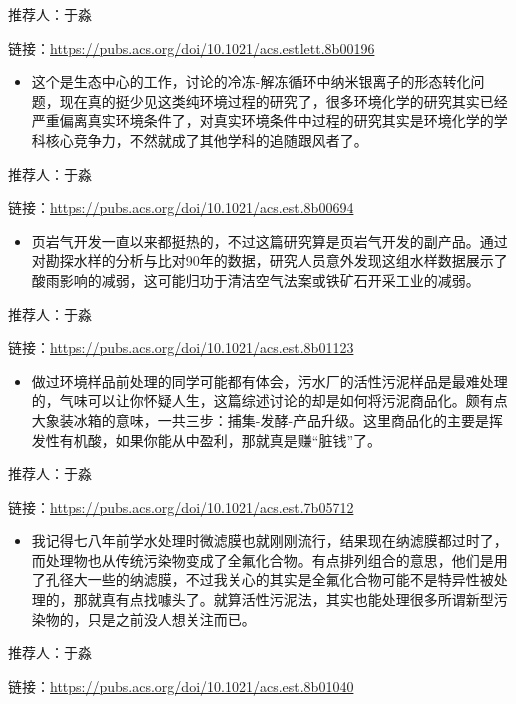 \documentclass[]{book}
\providecommand{\tightlist}{%
  \setlength{\itemsep}{0pt}\setlength{\parskip}{0pt}}
\begin{document}
推荐人：于淼

链接：\url{https://pubs.acs.org/doi/10.1021/acs.estlett.8b00196}

\begin{itemize}
\tightlist
\item
  这个是生态中心的工作，讨论的冷冻-解冻循环中纳米银离子的形态转化问题，现在真的挺少见这类纯环境过程的研究了，很多环境化学的研究其实已经严重偏离真实环境条件了，对真实环境条件中过程的研究其实是环境化学的学科核心竞争力，不然就成了其他学科的追随跟风者了。
\end{itemize}

推荐人：于淼

链接：\url{https://pubs.acs.org/doi/10.1021/acs.est.8b00694}

\begin{itemize}
\tightlist
\item
  页岩气开发一直以来都挺热的，不过这篇研究算是页岩气开发的副产品。通过对勘探水样的分析与比对90年的数据，研究人员意外发现这组水样数据展示了酸雨影响的减弱，这可能归功于清洁空气法案或铁矿石开采工业的减弱。
\end{itemize}

推荐人：于淼

链接：\url{https://pubs.acs.org/doi/10.1021/acs.est.8b01123}

\begin{itemize}
\tightlist
\item
  做过环境样品前处理的同学可能都有体会，污水厂的活性污泥样品是最难处理的，气味可以让你怀疑人生，这篇综述讨论的却是如何将污泥商品化。颇有点大象装冰箱的意味，一共三步：捕集-发酵-产品升级。这里商品化的主要是挥发性有机酸，如果你能从中盈利，那就真是赚``脏钱''了。
\end{itemize}

推荐人：于淼

链接：\url{https://pubs.acs.org/doi/10.1021/acs.est.7b05712}

\begin{itemize}
\tightlist
\item
  我记得七八年前学水处理时微滤膜也就刚刚流行，结果现在纳滤膜都过时了，而处理物也从传统污染物变成了全氟化合物。有点排列组合的意思，他们是用了孔径大一些的纳滤膜，不过我关心的其实是全氟化合物可能不是特异性被处理的，那就真有点找噱头了。就算活性污泥法，其实也能处理很多所谓新型污染物的，只是之前没人想关注而已。
\end{itemize}

推荐人：于淼

链接：\url{https://pubs.acs.org/doi/10.1021/acs.est.8b01040}
\end{document}

